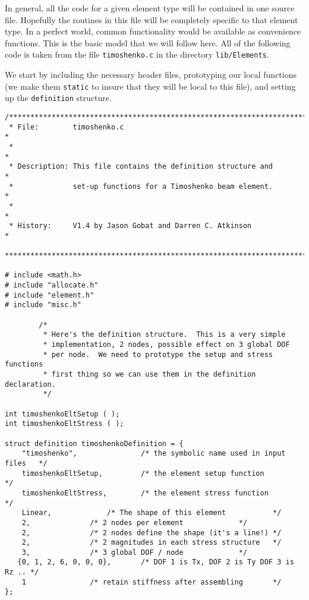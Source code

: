 In general, all the code for a given element type will be contained in one
source file.  Hopefully the routines in this file will be completely
specific to that element type.  In a perfect world, common functionality
would be available as convenience functions.  This is the basic model
that we will follow here.  All of the following code is taken from
the file {\tt timoshenko.c} in the directory {\tt lib/Elements}.

We start by including the necessary header
files, prototyping our local functions (we make them {\tt static} to 
insure that they will be local to this file), and setting up the 
{\tt definition} structure.

{\small
\begin{screen}
 \begin{verbatim}
/************************************************************************
 * File:        timoshenko.c                                            *
 *                                                                      *
 * Description: This file contains the definition structure and         *
 *              set-up functions for a Timoshenko beam element.         *
 *                                                                      *
 * History:     V1.4 by Jason Gobat and Darren C. Atkinson              *
 ************************************************************************/

# include <math.h>
# include "allocate.h"
# include "element.h"
# include "misc.h"

        /*      
         * Here's the definition structure.  This is a very simple
         * implementation, 2 nodes, possible effect on 3 global DOF
         * per node.  We need to prototype the setup and stress functions
         * first thing so we can use them in the definition declaration.
         */

int timoshenkoEltSetup ( );
int timoshenkoEltStress ( );

struct definition timoshenkoDefinition = {
    "timoshenko",               /* the symbolic name used in input files   */
    timoshenkoEltSetup,         /* the element setup function              */
    timoshenkoEltStress,        /* the element stress function             */
    Linear, 			/* The shape of this element		   */
    2, 				/* 2 nodes per element			   */
    2, 				/* 2 nodes define the shape (it's a line!) */
    2, 				/* 2 magnitudes in each stress structure   */
    3, 				/* 3 global DOF / node			   */
   {0, 1, 2, 6, 0, 0, 0},      	/* DOF 1 is Tx, DOF 2 is Ty DOF 3 is Rz .. */
    1				/* retain stiffness after assembling	   */
};


\end{verbatim}
\end{screen}}
